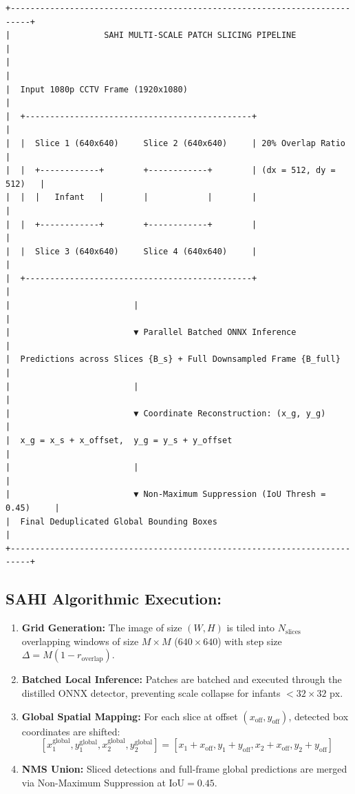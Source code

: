 \begin{verbatim}
+--------------------------------------------------------------------------+
|                   SAHI MULTI-SCALE PATCH SLICING PIPELINE                |
|                                                                          |
|  Input 1080p CCTV Frame (1920x1080)                                      |
|  +----------------------------------------------+                        |
|  |  Slice 1 (640x640)     Slice 2 (640x640)     | 20% Overlap Ratio      |
|  |  +------------+        +------------+        | (dx = 512, dy = 512)   |
|  |  |   Infant   |        |            |        |                        |
|  |  +------------+        +------------+        |                        |
|  |  Slice 3 (640x640)     Slice 4 (640x640)     |                        |
|  +----------------------------------------------+                        |
|                         |                                                 |
|                         ▼ Parallel Batched ONNX Inference                 |
|  Predictions across Slices {B_s} + Full Downsampled Frame {B_full}        |
|                         |                                                 |
|                         ▼ Coordinate Reconstruction: (x_g, y_g)           |
|  x_g = x_s + x_offset,  y_g = y_s + y_offset                              |
|                         |                                                 |
|                         ▼ Non-Maximum Suppression (IoU Thresh = 0.45)     |
|  Final Deduplicated Global Bounding Boxes                                |
+--------------------------------------------------------------------------+
\end{verbatim}

\subsection{SAHI Algorithmic
Execution:}\label{sahi-algorithmic-execution}

\begin{enumerate}
\def\labelenumi{\arabic{enumi}.}
\tightlist
\item
  \textbf{Grid Generation:} The image of size \((W, H)\) is tiled into
  \(N_{\text{slices}}\) overlapping windows of size \(M \times M\)
  (\(640\times 640\)) with step size
  \(\Delta = M(1 - r_{\text{overlap}})\).
\item
  \textbf{Batched Local Inference:} Patches are batched and executed
  through the distilled ONNX detector, preventing scale collapse for
  infants \(<32\times 32\text{ px}\).
\item
  \textbf{Global Spatial Mapping:} For each slice at offset
  \((x_{\text{off}}, y_{\text{off}})\), detected box coordinates are
  shifted:
  \[[x_1^{\text{global}}, y_1^{\text{global}}, x_2^{\text{global}}, y_2^{\text{global}}] = [x_1 + x_{\text{off}}, y_1 + y_{\text{off}}, x_2 + x_{\text{off}}, y_2 + y_{\text{off}}]\]
\item
  \textbf{NMS Union:} Sliced detections and full-frame global
  predictions are merged via Non-Maximum Suppression at
  \(\text{IoU} = 0.45\).
\end{enumerate}

